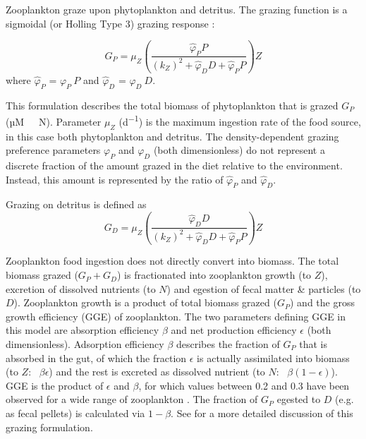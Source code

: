 \documentclass[journal abbreviation, manuscript]{copernicus}
\begin{document}
Zooplankton graze upon phytoplankton and detritus. The grazing function is a sigmoidal (or Holling Type 3) grazing response \citep{Anderson2015c}:


\begin{equation}
    G_P = \mu_Z \left( \frac{ \hat{\varphi}_P P}{(k_Z)^2 + \hat{\varphi}_D D +\hat{\varphi}_P P}  \right) Z
\end{equation}
where $\hat{\varphi}_P$ = $\varphi_P \ P$ and $\hat{\varphi}_D$ = $\varphi_D \ D$.

This formulation describes the total biomass of phytoplankton that is grazed $G_P$ (\unit{µM \ N}). Parameter $\mu_Z$ (\unit{d^{-1}}) is the maximum ingestion rate of the food source, in this case both phytoplankton and detritus. The density-dependent grazing preference parameters $\varphi_P$ and $\varphi_D$ (both dimensionless) do not represent a discrete fraction of the amount grazed in the diet relative to the environment. Instead, this amount is represented by the ratio of $\hat{\varphi}_P$ and $\hat{\varphi}_D$.

Grazing on detritus is defined as
\begin{equation}
    G_D = \mu_Z \left( \frac{ \hat{\varphi}_D D}{(k_Z)^2 + \hat{\varphi}_D D +\hat{\varphi}_P P}  \right) Z
\end{equation}

Zooplankton food ingestion does not directly convert into biomass. The total biomass grazed ($G_P + G_D$) is fractionated into zooplankton growth (to $Z$), excretion of dissolved nutrients (to $N$) and egestion of fecal matter \& particles (to $D$). Zooplankton growth is a product of total biomass grazed ($G_P$) and the gross growth efficiency (GGE) of zooplankton. The two parameters defining GGE in this model are absorption efficiency $\beta$ and net production efficiency $\epsilon$ (both dimensionless). Adsorption efficiency $\beta$ describes the fraction of $G_P$ that is absorbed in the gut, of which the fraction $\epsilon$ is actually assimilated into biomass (to $Z$: \ $\beta \epsilon$) and the rest is excreted as dissolved nutrient (to $N$: \ $\beta (1-\epsilon)$). GGE is the product of $\epsilon$ and $\beta$, for which values between 0.2 and 0.3 have been observed for a wide range of zooplankton \citep{Straile1997GrossGroup}. The fraction of $G_P$ egested to $D$ (e.g. as fecal pellets) is calculated via $1-\beta$. See \citet{Anderson2015c} for a more detailed discussion of this grazing formulation.
\end{document}

